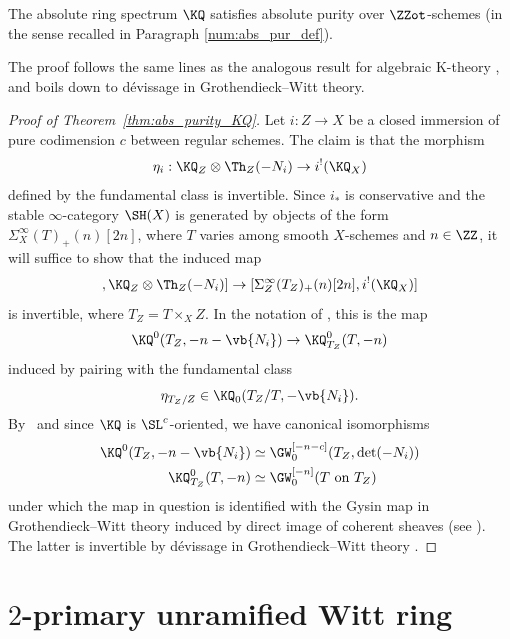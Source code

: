 \begin{thm}\label{thm:abs_purity_KQ}
The absolute ring spectrum $\KQ$ satisfies absolute purity over $\ZZot$-schemes (in the sense recalled in Paragraph \ref{num:abs_pur_def}).
\end{thm}

The proof follows the same lines as the analogous result for algebraic K-theory \cite[Th.\,13.6.3]{CD3}, and boils down to dévissage in Grothendieck--Witt theory.

\begin{proof}[Proof of Theorem~\ref{thm:abs_purity_KQ}]
Let $i:Z\to X$ be a closed immersion of pure codimension $c$ between regular schemes.
The claim is that the morphism
\[
\eta_i : \KQ_Z \otimes \Th_Z(-N_i) \to i^!(\KQ_X)
\]
defined by the fundamental class is invertible.
Since $i_*$ is conservative and the stable $\infty$-category $\SH(X)$ is generated by objects of the form $\Sigma^\infty_X(T)_+(n)[2n]$, where $T$ varies among smooth $X$-schemes and $n\in\ZZ$, it will suffice to show that the induced map
\begin{equation*}
[\Sigma^\infty_Z(T_Z)_+(n)[2n],\KQ_Z\otimes\Th_Z(-N_i)]
\to [\Sigma^\infty_Z(T_Z)_+(n)[2n],i^!(\KQ_X)]
\end{equation*}
is invertible, where $T_Z = T\times_X Z$.
In the notation of \cite{DJK}, this is the map
\begin{equation*}
\KQ^0(T_Z, -n-\vb{N_i}) \to \KQ^0_{T_Z}(T, -n)
\end{equation*}
induced by pairing with the fundamental class
\[
\eta_{T_Z/Z} \in \KQ_0(T_Z/T, -\vb{N_i}).
\]
By~\cite[Cor.\,7.3]{PaninWalter1} and since $\KQ$ is $\SL^c$-oriented, we have canonical isomorphisms
\begin{align*}
\KQ^0(T_Z, -n-\vb{N_i}) &\simeq \GW_{0}^{[-n-c]}(T_Z, \det(-N_i))\\
\KQ^0_{T_Z}(T, -n) &\simeq \GW_{0}^{[-n]}(T~\text{on}~T_Z)
\end{align*}
under which the map in question is identified with the Gysin map in Grothendieck--Witt theory induced by direct image of coherent sheaves (see \cite[(9.9)]{Schlicht2}).
The latter is invertible by dévissage in Grothendieck--Witt theory \cite[Th.\,9.5, 9.18 \& 9.19]{Schlicht2}.
\end{proof}

\section{\texorpdfstring{$2$}{2}-primary unramified Witt ring}
\label{apd:W}

